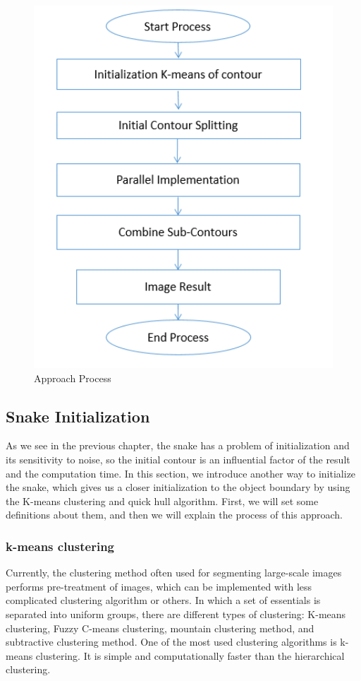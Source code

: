 \begin{figure}[ht]
    \centering
    \includegraphics[width=12cm]{chapiter3/figures/figure 01 Approach Process.png}
    \setlength{\fboxrule}{2pt}
    \caption{Approach Process}
    \label{fig:figure3.1}
\end{figure}

\subsection{Snake Initialization}\label{subsec:snake-initialization}
As we see in the previous chapter, the snake has a problem of initialization and its
sensitivity to noise, so the initial contour is an influential factor of the result and the
computation time. In this section, we introduce another way to initialize the snake,
which gives us a closer initialization to the object boundary by using the K-means
clustering and quick hull algorithm. First, we will set some definitions about them,
and then we will explain the process of this approach.\\

\subsubsection{k-means clustering}
Currently, the clustering method often used for segmenting large-scale images
performs pre-treatment of images, which can be implemented with less complicated
clustering algorithm or others. In which a set of essentials is separated into uniform
groups, there are different types of clustering: K-means clustering, Fuzzy C-means
clustering, mountain clustering method, and subtractive clustering method. One of
the most used clustering algorithms is k-means clustering. It is simple and
computationally faster than the hierarchical clustering.

